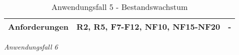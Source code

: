 \begin{table}[h]
\begin{adjustbox}{max width=\textwidth}
\begin{tabular}{lp{7.0cm}p{7.0cm}}
        Anforderungen                   &R2, R5, F7-F12, NF10, NF15-NF20& -\\
        \bottomrule
    \end{tabular}
    \end{adjustbox}
    \caption{%
    Anwendungsfall 5 - Bestandswachstum   }
    \label{tab:AF_Bestandswachstum}
    \end{table}
\endgroup


\newpage
\noindent
\textit{Anwendungsfall 6}

